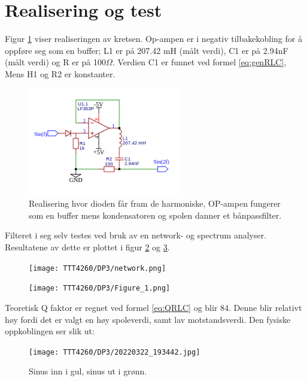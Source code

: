 \documentclass[a4paper,11pt,norsk]{article}
\begin{document}
\section{Realisering og test}
\label{sec:realisering}

Figur \ref{fig:Multiplikator} viser realiseringen av kretsen. Op-ampen er i negativ tilbakekobling for å oppføre seg som en buffer; L1 er på 207.42 mH (målt verdi), C1 er på 2.94nF (målt verdi) og R er på 100${\Omega}$. Verdien C1 er funnet ved formel \ref{eq:genRLC}, Mens H1 og R2 er konstanter.



\begin{figure}[H]
  \centering
  \includegraphics[width=0.6\textwidth]{designnotater/DN3/SchematicCRKT.png} 
  \caption{Realisering hvor dioden får fram de harmoniske, OP-ampen fungerer som en buffer mens kondensatoren og spolen danner et bånpassfilter.}
  \label{fig:Multiplikator}
\end{figure}

Filteret i seg selv testes ved bruk av en network- og spectrum analyser. Resultatene av dette er plottet i figur \ref{fig:netwok} og \ref{fig:bode}.

\begin{figure}[H]
  \centering
  \texttt{[image: TTT4260/DP3/network.png]} 
  \caption{}
  \label{fig:netwok}
\end{figure}

\begin{figure}[H]
  \centering
  \texttt{[image: TTT4260/DP3/Figure\_1.png]} 
  \caption{}
  \label{fig:bode}
\end{figure}

Teoretisk Q faktor er regnet ved formel \ref{eq:QRLC} og blir 84. Denne blir relativt høy fordi det er valgt en høy spoleverdi, samt lav motstandsverdi. Den fysiske oppkoblingen ser slik ut:

\begin{figure}[H]
  \centering
  \texttt{[image: TTT4260/DP3/20220322\_193442.jpg]} 
  \caption{Sinus inn i gul, sinus ut i grønn.}
  \label{fig:Fysisk}
\end{figure}
\end{document}
